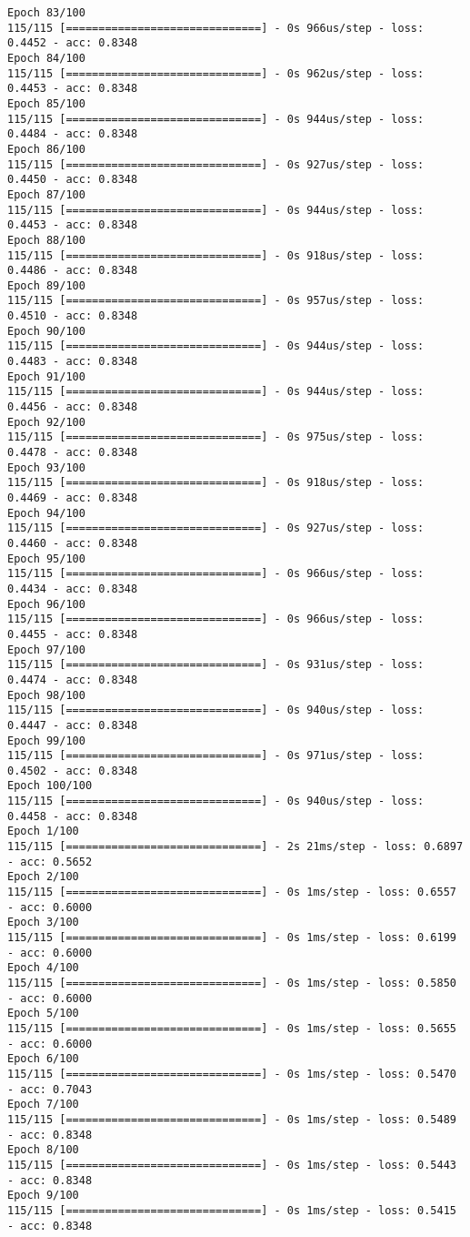 \documentclass[11pt]{article}
\begin{document}
\begin{Verbatim}[commandchars=\\\{\}]
Epoch 83/100
115/115 [==============================] - 0s 966us/step - loss: 0.4452 - acc: 0.8348
Epoch 84/100
115/115 [==============================] - 0s 962us/step - loss: 0.4453 - acc: 0.8348
Epoch 85/100
115/115 [==============================] - 0s 944us/step - loss: 0.4484 - acc: 0.8348
Epoch 86/100
115/115 [==============================] - 0s 927us/step - loss: 0.4450 - acc: 0.8348
Epoch 87/100
115/115 [==============================] - 0s 944us/step - loss: 0.4453 - acc: 0.8348
Epoch 88/100
115/115 [==============================] - 0s 918us/step - loss: 0.4486 - acc: 0.8348
Epoch 89/100
115/115 [==============================] - 0s 957us/step - loss: 0.4510 - acc: 0.8348
Epoch 90/100
115/115 [==============================] - 0s 944us/step - loss: 0.4483 - acc: 0.8348
Epoch 91/100
115/115 [==============================] - 0s 944us/step - loss: 0.4456 - acc: 0.8348
Epoch 92/100
115/115 [==============================] - 0s 975us/step - loss: 0.4478 - acc: 0.8348
Epoch 93/100
115/115 [==============================] - 0s 918us/step - loss: 0.4469 - acc: 0.8348
Epoch 94/100
115/115 [==============================] - 0s 927us/step - loss: 0.4460 - acc: 0.8348
Epoch 95/100
115/115 [==============================] - 0s 966us/step - loss: 0.4434 - acc: 0.8348
Epoch 96/100
115/115 [==============================] - 0s 966us/step - loss: 0.4455 - acc: 0.8348
Epoch 97/100
115/115 [==============================] - 0s 931us/step - loss: 0.4474 - acc: 0.8348
Epoch 98/100
115/115 [==============================] - 0s 940us/step - loss: 0.4447 - acc: 0.8348
Epoch 99/100
115/115 [==============================] - 0s 971us/step - loss: 0.4502 - acc: 0.8348
Epoch 100/100
115/115 [==============================] - 0s 940us/step - loss: 0.4458 - acc: 0.8348
Epoch 1/100
115/115 [==============================] - 2s 21ms/step - loss: 0.6897 - acc: 0.5652
Epoch 2/100
115/115 [==============================] - 0s 1ms/step - loss: 0.6557 - acc: 0.6000
Epoch 3/100
115/115 [==============================] - 0s 1ms/step - loss: 0.6199 - acc: 0.6000
Epoch 4/100
115/115 [==============================] - 0s 1ms/step - loss: 0.5850 - acc: 0.6000
Epoch 5/100
115/115 [==============================] - 0s 1ms/step - loss: 0.5655 - acc: 0.6000
Epoch 6/100
115/115 [==============================] - 0s 1ms/step - loss: 0.5470 - acc: 0.7043
Epoch 7/100
115/115 [==============================] - 0s 1ms/step - loss: 0.5489 - acc: 0.8348
Epoch 8/100
115/115 [==============================] - 0s 1ms/step - loss: 0.5443 - acc: 0.8348
Epoch 9/100
115/115 [==============================] - 0s 1ms/step - loss: 0.5415 - acc: 0.8348

\end{Verbatim}
\end{document}
